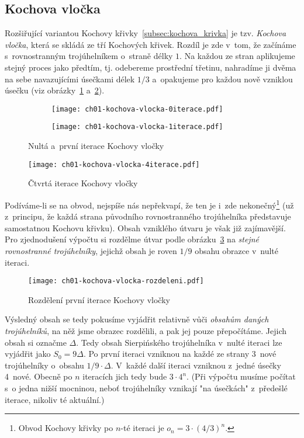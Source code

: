 \subsection{Kochova vločka}\label{subsec:kochova_vlocka}
Rozšiřující variantou Kochovy křivky~\ref{subsec:kochova_krivka} je tzv. \emph{Kochova vločka}, která se skládá ze tří Kochových křivek. Rozdíl je zde v~tom, že začínáme s~rovnostranným trojúhelníkem o~straně délky $1$. Na každou ze stran aplikujeme stejný proces jako předtím, tj. odebereme prostřední třetinu, nahradíme ji dvěma na sebe navazujícími úsečkami délek $1/3$ a~opakujeme pro každou nově vzniklou úsečku (viz obrázky~\ref{fig:kochova_vlocka_dve_iterace} a~\ref{fig:kochova_krivka_5iterace}).
\begin{figure}[h]
    \centering
    \begin{subfigure}{\subfigwidth}
        \centering
        \texttt{[image: ch01-kochova-vlocka-0iterace.pdf]}
    \end{subfigure}
    \qquad
    \begin{subfigure}{\subfigwidth}
        \centering
        \texttt{[image: ch01-kochova-vlocka-1iterace.pdf]}
    \end{subfigure}
    \caption{Nultá a~první iterace Kochovy vločky}
    \label{fig:kochova_vlocka_dve_iterace}
\end{figure}
\begin{figure}[h]
    \centering
    \texttt{[image: ch01-kochova-vlocka-4iterace.pdf]}
    \caption{Čtvrtá iterace Kochovy vločky}
    \label{fig:kochova_krivka_5iterace}
\end{figure}
Podíváme-li se na obvod, nejspíše nás nepřekvapí, že ten je i~zde nekonečný\footnote{Obvod Kochovy křivky po $n$-té iteraci je $o_n=3\cdot(4/3)^{n}$.} (už z~principu, že každá strana původního rovnostranného trojúhelníka představuje samostatnou Kochovu křivku).
Obsah vzniklého útvaru je však již zajímavější. Pro zjednodušení výpočtu si rozdělme útvar podle obrázku~\ref{fig:kochova_vlocka_rozdeleni} na \emph{stejné rovnostranné trojúhelníky}, jejichž obsah je roven $1/9$ obsahu obrazce v~nulté iteraci.
\begin{figure}[h]
    \centering
    \texttt{[image: ch01-kochova-vlocka-rozdeleni.pdf]}
    \caption{Rozdělení první iterace Kochovy vločky}
    \label{fig:kochova_vlocka_rozdeleni}
\end{figure}
Výsledný obsah se tedy pokusíme vyjádřit relativně vůči \emph{obsahům daných trojúhelníků}, na něž jsme obrazec rozdělili, a pak jej pouze přepočítáme. Jejich obsah si označme $\Delta$. Tedy obsah Sierpińského trojúhelníka v~nulté iteraci lze vyjádřit jako $S_0=9\Delta$. Po první iteraci vzniknou na každé ze strany 3~nové trojúhelníky o~obsahu $1/9\cdot\Delta$. V~každé další iteraci vzniknou z~jedné úsečky 4~nové. Obecně po $n$ iteracích jich tedy bude $3\cdot 4^{n}$. (Při výpočtu musíme počítat s~o jedna nižší mocninou, neboť trojúhelníky vznikají "na úsečkách" z~předešlé iterace, nikoliv té aktuální.)\par
